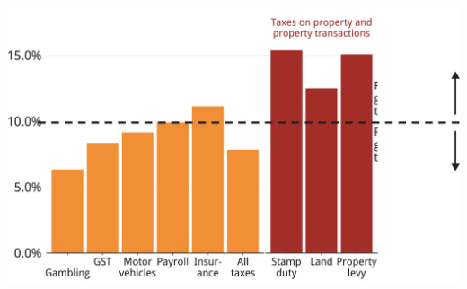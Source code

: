 \documentclass[tikz]{standalone}\usepackage[]{graphicx}\usepackage[]{color}
\newenvironment{knitrout}{}{} %
\begin{document}
\clearpage
\begin{knitrout}
\color{fgcolor}
\includegraphics[width=11.55in,height=7.00in]{./Property-taxes/atlas/figure/PROP-Figure3-textwidth-1} 

\end{knitrout}
\clearpage
\end{document}
